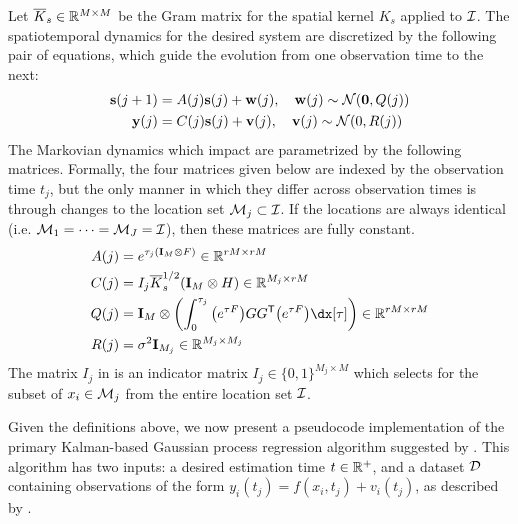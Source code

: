 \documentclass[10pt]{article}
\numberwithin{equation}{section}
\begin{document}
Let $\overline{K}_{s} \in \mathbb{R}^{M \times M}$ be the Gram matrix for the spatial kernel $K_{s}$ applied to $\mathcal{I}$. The spatiotemporal dynamics for the desired system are discretized by the following pair of equations, which guide the evolution from one observation time to the next:
\begin{subequations}
    \label{eq:todescato-discrete-evolution}
    \begin{align}
        \mathbf{s}(j+1) &= A(j)\mathbf{s}(j) + \mathbf{w}(j), \quad \mathbf{w}(j) \sim \mathcal{N}(\mathbf{0}, Q(j)) \label{eq:todescato-discretized-state}\\
        \mathbf{y}(j) &= C(j)\mathbf{s}(j) + \mathbf{v}(j), \quad \mathbf{v}(j) \sim \mathcal{N}(0, R(j)) \label{eq:todescato-discretized-measure}
    \end{align}
\end{subequations}
The Markovian dynamics which impact  are parametrized by the following matrices. Formally, the four matrices given below are indexed by the observation time $t_{j}$, but the only manner in which they differ across observation times is through changes to the location set $\mathcal{M}_{j} \subset \mathcal{I}$. If the locations are always identical (i.e. $\mathcal{M}_{1} = \dots = \mathcal{M}_{J} = \mathcal{I}$), then these matrices are fully constant. 
\begin{subequations}
    \label{eq:todescato-discretize-parameters}
    \begin{align}
        A(j) &= e^{\tau_{j}(\bfI_{M} \otimes F)} \in \bbR^{rM \times rM} \label{eq:todescato-discretize-Aj}\\
        C(j) &= I_{j}\overline{K}_{s}^{1/2}(\bfI_{M} \otimes H) \in \bbR^{M_{j} \times rM} \label{eq:todescato-discretize-Cj}\\
        Q(j) &= \bfI_{M} \otimes \left(\int_{0}^{\tau_{j}}\big(e^{\tau{F}}\big)GG^{\sfTsmall}\big(e^{\tau{F}}\big)\dx[\tau]\right) \in \bbR^{rM \times rM} \label{eq:todescato-discretize-Qj}\\
        R(j) &= \sigma^{2}\bfI_{M_{j}} \in \bbR^{M_{j} \times M_{j}} \label{eq:todescato-discretize-Rj}
    \end{align}
\end{subequations}
The matrix $I_{j}$ in  is an indicator matrix $I_{j} \in \{0, 1\}^{M_{j} \times M}$ which selects for the subset of $x_{i} \in \mathcal{M}_{j}$ from the entire location set $\mathcal{I}$.

Given the definitions above, we now present a pseudocode implementation of the primary Kalman-based Gaussian process regression algorithm suggested by \citeauthor{Todescato-Efficient-2020}. This algorithm has two inputs: a desired estimation time $t \in \mathbb{R}^{+}$, and a dataset $\mathcal{D}$ containing observations of the form $y_{i}(t_{j}) = f(x_{i}, t_{j}) + v_{i}(t_{j})$, as described by .
\end{document}
